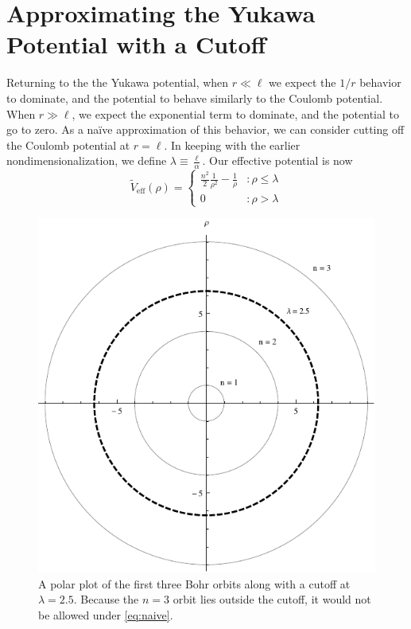\documentclass[12pt,twoside]{reedthesis}
\newcommand{\eqn}[1]{\begin{equation}#1\end{equation}}
\begin{document}
\section{Approximating the Yukawa Potential with a Cutoff}

Returning to the the Yukawa potential, when $r \ll \ell$ we expect the $1/r$ behavior to dominate, and the potential to behave similarly to the Coulomb potential. When $r \gg \ell$, we expect the exponential term to dominate, and the potential to go to zero. As a na\"ive approximation of this behavior, we can consider cutting off the Coulomb potential at $r = \ell$. In keeping with the earlier nondimensionalization, we define $\lambda \equiv \frac{\ell}{\alpha}$. Our effective potential is now
\eqn{
\tilde{V}_{\mathrm{eff}}(\rho) = \left\{
\begin{array}{lr}
 \frac{n^2}{2}\frac{1}{\rho^2}-\frac{1}{\rho} & : \rho \leq \lambda \\
0 & : \rho > \lambda
\end{array}
\right.
\label{eq:naive}
}

\begin{figure}[h]
\centering
	\includegraphics{Figures/cutoff}
	\caption[Yukawa orbits with cutoff]{A polar plot of the first three Bohr orbits along with a cutoff at $\lambda = 2.5$. Because the $n=3$ orbit lies outside the cutoff, it would not be allowed under \eqref{eq:naive}.}
	\label{fig:cutoff}
\end{figure}
\end{document}
